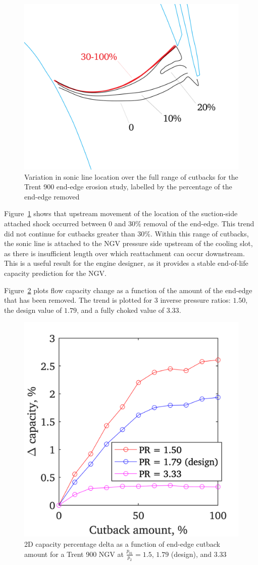 \documentclass[a4paper, 11pt, oneside]{report}
\begin{document}
\begin{figure}[H]
      \centering
      \includegraphics[width=.7\textwidth]{figs/ss_cutbacks_m1_lines_illustration.png}
      \caption{Variation in sonic line location over the full range of cutbacks for the Trent 900 end-edge erosion study, labelled by the percentage of the end-edge removed}
      \label{fig:ss_cutbacks_m1_lines_illustration}
\end{figure}

Figure~\ref{fig:ss_cutbacks_m1_lines_illustration} shows that upstream movement of the location of the suction-side attached shock occurred between $0$ and $30\%$ removal of the end-edge. This trend did not continue for cutbacks greater than $30\%$. Within this range of cutbacks, the sonic line is attached to the NGV pressure side upstream of the cooling slot, as there is insufficient length over which reattachment can occur downstream. This is a useful result for the engine designer, as it provides a stable end-of-life capacity prediction for the NGV.

Figure~\ref{fig:ss_cutbacks_vs_capacities_pressure_ratios} plots flow capacity change as a function of the amount of the end-edge that has been removed. The trend is plotted for 3 inverse pressure ratios: $1.50$, the design value of $1.79$, and a fully choked value of $3.33$.

\begin{figure}[H]
	\centering
	\includegraphics[width=.45\textwidth]{figs/ss_cutbacks_vs_capacities_pressure_ratios.png}
	\caption{2D capacity percentage delta as a function of end-edge cutback amount for a Trent 900 NGV at $\frac{p_{01}}{p_2}=1.5$, $1.79$ (design), and $3.33$}
    \label{fig:ss_cutbacks_vs_capacities_pressure_ratios}
\end{figure}
\end{document}
